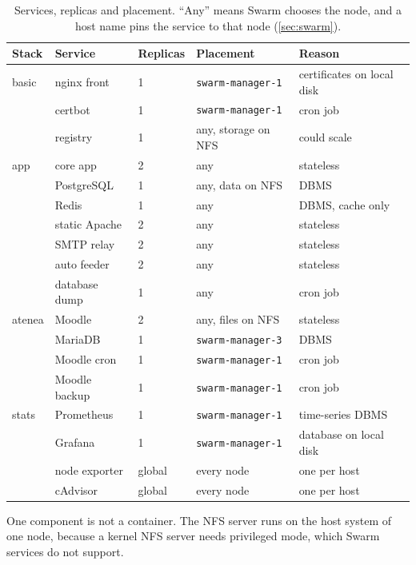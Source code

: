 \begin{table}[htbp]
  \centering
  \caption{Services, replicas and placement. ``Any'' means Swarm chooses
    the node, and a host name pins the service to that node
    (\cref{sec:swarm}).}
  \label{tab:services}
  \small
  \begin{tabular}{lllll}
    \toprule
    Stack  & Service          & Replicas & Placement                    & Reason \\
    \midrule
    basic  & nginx front      & 1        & \texttt{swarm-manager-1}     & certificates on local disk \\
           & certbot          & 1        & \texttt{swarm-manager-1}     & cron job \\
           & registry         & 1        & any, storage on NFS          & could scale \\
    \midrule
    app    & core app         & 2        & any                          & stateless \\
           & PostgreSQL       & 1        & any, data on NFS             & DBMS \\
           & Redis            & 1        & any                          & DBMS, cache only \\
           & static Apache    & 2        & any                          & stateless \\
           & SMTP relay       & 2        & any                          & stateless \\
           & auto feeder      & 2        & any                          & stateless \\
           & database dump    & 1        & any                          & cron job \\
    \midrule
    atenea & Moodle           & 2        & any, files on NFS            & stateless \\
           & MariaDB          & 1        & \texttt{swarm-manager-3}     & DBMS \\
           & Moodle cron      & 1        & \texttt{swarm-manager-1}     & cron job \\
           & Moodle backup    & 1        & \texttt{swarm-manager-1}     & cron job \\
    \midrule
    stats  & Prometheus       & 1        & \texttt{swarm-manager-1}     & time-series DBMS \\
           & Grafana          & 1        & \texttt{swarm-manager-1}     & database on local disk \\
           & node exporter    & global   & every node                   & one per host \\
           & cAdvisor         & global   & every node                   & one per host \\
    \bottomrule
  \end{tabular}
\end{table}

One component is not a container. The NFS server runs on the host
system of one node, because a kernel NFS server needs privileged mode,
which Swarm services do not support.
